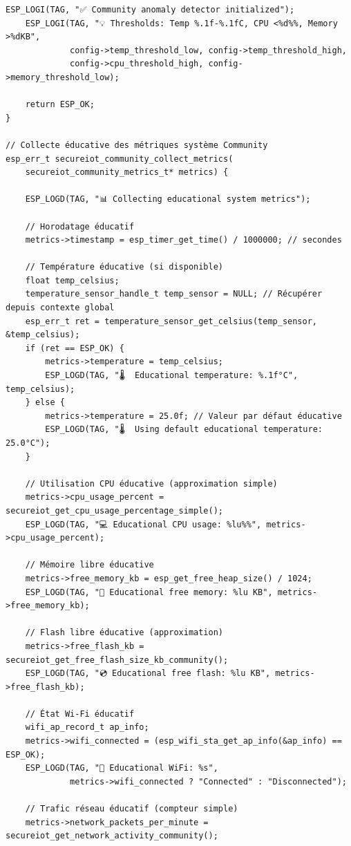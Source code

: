 \begin{lstlisting}[caption={Module éducatif de détection d'anomalies par seuils}]
    ESP_LOGI(TAG, "✅ Community anomaly detector initialized");
    ESP_LOGI(TAG, "💡 Thresholds: Temp %.1f-%.1fC, CPU <%d%%, Memory >%dKB", 
             config->temp_threshold_low, config->temp_threshold_high,
             config->cpu_threshold_high, config->memory_threshold_low);
    
    return ESP_OK;
}

// Collecte éducative des métriques système Community
esp_err_t secureiot_community_collect_metrics(
    secureiot_community_metrics_t* metrics) {
    
    ESP_LOGD(TAG, "📊 Collecting educational system metrics");
    
    // Horodatage éducatif
    metrics->timestamp = esp_timer_get_time() / 1000000; // secondes
    
    // Température éducative (si disponible)
    float temp_celsius;
    temperature_sensor_handle_t temp_sensor = NULL; // Récupérer depuis contexte global
    esp_err_t ret = temperature_sensor_get_celsius(temp_sensor, &temp_celsius);
    if (ret == ESP_OK) {
        metrics->temperature = temp_celsius;
        ESP_LOGD(TAG, "🌡️  Educational temperature: %.1f°C", temp_celsius);
    } else {
        metrics->temperature = 25.0f; // Valeur par défaut éducative
        ESP_LOGD(TAG, "🌡️  Using default educational temperature: 25.0°C");
    }
    
    // Utilisation CPU éducative (approximation simple)
    metrics->cpu_usage_percent = secureiot_get_cpu_usage_percentage_simple();
    ESP_LOGD(TAG, "💻 Educational CPU usage: %lu%%", metrics->cpu_usage_percent);
    
    // Mémoire libre éducative
    metrics->free_memory_kb = esp_get_free_heap_size() / 1024;
    ESP_LOGD(TAG, "💾 Educational free memory: %lu KB", metrics->free_memory_kb);
    
    // Flash libre éducative (approximation)
    metrics->free_flash_kb = secureiot_get_free_flash_size_kb_community();
    ESP_LOGD(TAG, "💿 Educational free flash: %lu KB", metrics->free_flash_kb);
    
    // État Wi-Fi éducatif
    wifi_ap_record_t ap_info;
    metrics->wifi_connected = (esp_wifi_sta_get_ap_info(&ap_info) == ESP_OK);
    ESP_LOGD(TAG, "📶 Educational WiFi: %s", 
             metrics->wifi_connected ? "Connected" : "Disconnected");
    
    // Trafic réseau éducatif (compteur simple)
    metrics->network_packets_per_minute = secureiot_get_network_activity_community();
    

\end{lstlisting}
